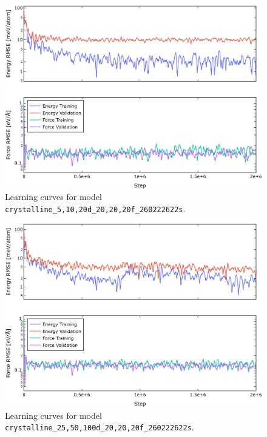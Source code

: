 \begin{figure}
  \begin{center}
    \includegraphics[width=.8\textwidth]{
      asset/crystalline_5,10,20d_20,20,20f_260222622s_energy_force_l_curve.jpg
    }
  \end{center}
  \caption{Learning curves for model \texttt{crystalline\_5,10,20d\_20,20,20f\_260222622s}.}
  \label{fig:crystalline_5,10,20d_20,20,20f_260222622s-learning-curves}
\end{figure}

\begin{figure}
  \begin{center}
    \includegraphics[width=.8\textwidth]{
      asset/crystalline_25,50,100d_20,20,20f_260222622s_energy_force_l_curve.jpg
    }
  \end{center}
  \caption{Learning curves for model \texttt{crystalline\_25,50,100d\_20,20,20f\_260222622s}.}
  \label{fig:crystalline_25,50,100d_20,20,20f_260222622s-learning-curves}
\end{figure}


